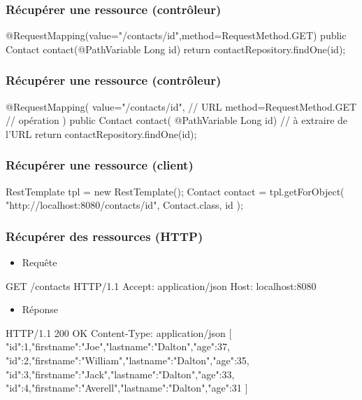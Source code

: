 \begin{frame}[fragile]
 \frametitle{Récupérer une ressource (contrôleur)}

 \begin{javacode}
@RequestMapping(value="/contacts/{id}",method=RequestMethod.GET)
public Contact contact(@PathVariable Long id) {
  return contactRepository.findOne(id);
}
 \end{javacode}

\end{frame}

\begin{frame}[fragile]
 \frametitle{Récupérer une ressource (contrôleur)}

 \begin{javacode}
@RequestMapping(
  value="/contacts/{id}",     // URL
  method=RequestMethod.GET    // op\'eration
)
public Contact contact(
    @PathVariable Long id) {  // \`a extraire de l'URL
  return contactRepository.findOne(id);
}
 \end{javacode}

\end{frame}

\begin{frame}[fragile]
 \frametitle{Récupérer une ressource (client)}

 \begin{javacode}
RestTemplate tpl = new RestTemplate();
Contact contact = tpl.getForObject(
  "http://localhost:8080/contacts/{id}",
  Contact.class,
  id
);
 \end{javacode}

\end{frame}

\begin{frame}[fragile]
 \frametitle{Récupérer des ressources (HTTP)}

 \begin{itemize}
  \item Requête
 \end{itemize}

 \begin{textcode}
GET /contacts HTTP/1.1
Accept: application/json
Host: localhost:8080
 \end{textcode}

  \begin{itemize}
  \item Réponse
 \end{itemize}

 \begin{textcode}
HTTP/1.1 200 OK
Content-Type: application/json
[
 {"id":1,"firstname":"Joe","lastname":"Dalton","age":37},
 {"id":2,"firstname":"William","lastname":"Dalton","age":35},
 {"id":3,"firstname":"Jack","lastname":"Dalton","age":33},
 {"id":4,"firstname":"Averell","lastname":"Dalton","age":31}
]
 \end{textcode}

\end{frame}

